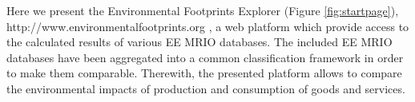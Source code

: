 Here we present the Environmental Footprints Explorer (Figure \ref{fig:startpage}), http://www.environmentalfootprints.org , a web platform which provide access to the calculated results of
various EE MRIO databases. The included EE MRIO databases have been aggregated into a common classification framework in order to make them comparable. Therewith, the presented platform allows to compare the environmental impacts of production and consumption of goods and services. 
    
